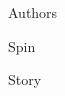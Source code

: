 \documentclass[white]{guildcamp1}
\begin{document}
\name{\wPressRelease{}}

\item Authors

\item Spin

\item Story
\end{document}
